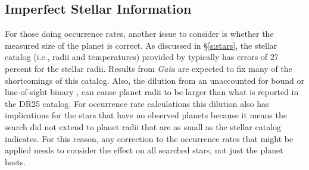 


\subsection{Imperfect Stellar Information}
For those doing occurrence rates, another issue to consider is whether the measured size of the planet is correct. As discussed in \S\ref{s:stars}, the stellar catalog (i.e., radii and temperatures) provided by \citet{Mathur2017ApJS} typically has errors of 27 percent for the stellar radii. Results from \textit{Gaia} \citep{gaia2,gaia1} are expected to fix many of the shortcomings of this catalog. Also, the dilution from an unaccounted for bound or line-of-sight binary \citep{Ciardi2015, Furlan2017}, can cause planet radii to be larger than what is reported in the DR25 catalog. For occurrence rate calculations this dilution also has implications for the stars that have no observed planets because it means the search did not extend to planet radii that are as small as the stellar catalog indicates.  For this reason, any correction to the occurrence rates that might be applied needs to consider the effect on all searched stars, not just the planet hosts.


